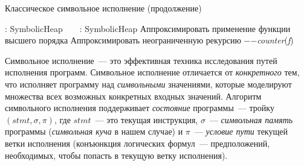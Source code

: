 {\begin{algorithm}
\begin{algorithmic}[1]
			\EndCase
				\State {}
				\State {}\label{algo:line:heap-manipulation-end}
			\EndCase
				\State {}
				\State {}
			\EndCase
	\EndSwitch
	\EndFunction
\end{algorithmic}
\end{algorithm}
\begin{algorithm}[t]
\caption{Классическое символьное исполнение (продолжение)}
\begin{algorithmic}[1]
	 : SymbolicHeap
		\label{algo:line:then-branch-begin}
			 \State {}
		\Else~\EndIf
			\State {}
		\Else~\EndIf\label{algo:line:else-branch-end}
		\State \Return {}\label{algo:line:merge}
	\EndFunction
	 : SymbolicHeap\label{algo:line:call-func-begin}
			\State Аппроксимировать применение функции высшего порядка
		\EndIf
			\State Аппроксимировать неограниченную рекурсию
		\EndIf
		\State {}
		\State $-$$-$\emph{counter}(\emph{f})
		\State {}
	\EndFunction\label{algo:line:call-func-end}
\end{algorithmic}
\end{algorithm}
}

Символьное исполнение~--- это эффективная техника исследования путей исполнения программ. Символьное исполнение отличается от \emph{конкретного} тем, что исполняет программу над \emph{символьными} значениями, которые моделируют множества всех возможных конкретных входных значений. Алгоритм символьного исполнения поддерживает \emph{состояние} программы~--- тройку $(stmt, \sigma, \pi)$, где $stmt$~--- это текущая инструкция, $\sigma$~--- \emph{символьная память} программы (\emph{символьная куча} в нашем случае) и $\pi$~--- \emph{условие пути} текущей ветки исполнения (конъюнкция логических формул~--- предположений, необходимых, чтобы попасть в текущую ветку исполнения).

